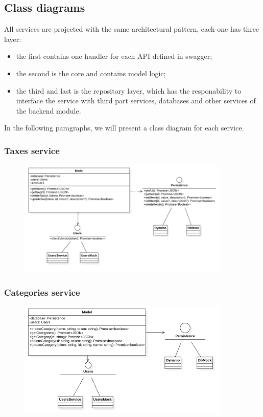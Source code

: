 \subsection{Class diagrams}
All services are projected with the same architectural pattern, each one has three layer:
\begin{itemize}
    \item the first contains one handler for each API defined in swagger;
    \item the second is the core and contains model logic;
    \item the third and last is the repository layer, which has the responability to interface the
          service with third part services, databases and other services of the backend module.
\end{itemize}
In the following paragraphs, we will present a class diagram for each service.

\subsubsection{Taxes service}
\begin{figure}[H]
    \includegraphics[width=0.9\textwidth]{res/images/class-diagrams/taxes.png}
\end{figure}

\subsubsection{Categories service}
\begin{figure}[H]
    \includegraphics[width=0.9\textwidth]{res/images/class-diagrams/categories.png}
\end{figure}

